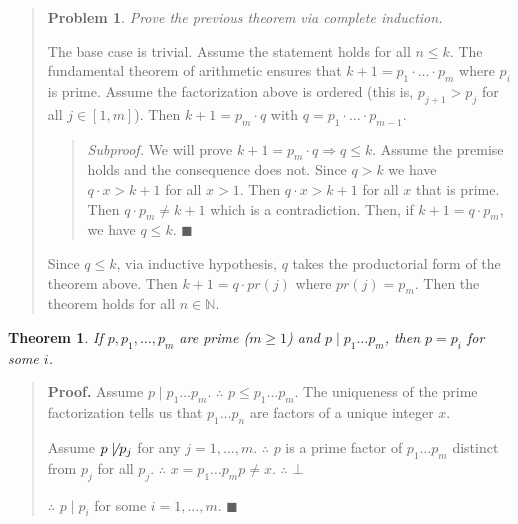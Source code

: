 \documentclass[a4paper, 12pt]{article}
\newtheorem{problem}{Problem}
\newtheorem{theorem}{Theorem}
\newtheorem{problem}{Problem}
\newtheorem{theorem}{Theorem}
\begin{document}
\small
\begin{quote}

\begin{problem}
    Prove the previous theorem via complete induction.
\end{problem}

The base case is trivial. Assume the statement holds for all $n \leq k$. The
fundamental theorem of arithmetic ensures that $k + 1 = p_1 \cdot \ldots \cdot
p_m$ where $p_i$ is prime. Assume the factorization above is ordered (this is,
$p_{j + 1} > p_j$ for all $j \in [1, m]$). Then $k + 1 = p_m \cdot q$ with $q =
p_1 \cdot \ldots \cdot p_{m - 1}$. 

\footnotesize
\begin{quote}
    \textit{Subproof.} We will prove $k + 1 = p_m \cdot q \Rightarrow q \leq k$.
    Assume the premise holds and the consequence does not. Since $q > k$ we have
    $q \cdot x > k + 1$ for all $x > 1$. Then $q \cdot x > k + 1$ for all $x$
    that is prime. Then $q \cdot p_m \neq k + 1$ which is a contradiction. Then,
    if $k + 1 = q \cdot p_m$, we have $q \leq k$. $\blacksquare$
\end{quote}
\small

Since $q \leq k$, via inductive hypothesis, $q$ takes the productorial form of
the theorem above. Then $k + 1 = q \cdot pr(j)$ where $pr(j) = p_m$. Then the
theorem holds for all $n \in \mathbb{N}$.

\end{quote}
\normalsize


\begin{theorem}
    If $p, p_1, \ldots, p_m$ are prime ($m \geq 1$) and $p \mid p_1 \ldots p_m$,
    then $p = p_i$ for some $i$.
\end{theorem}


\small
\begin{quote}

\textbf{Proof.} Assume $p \mid p_1 \ldots p_m$. $\therefore $ $p \leq p_1 \ldots
p_m$. The uniqueness of the prime factorization tells us that $p_1 \ldots p_n
$ are factors of a unique integer $x$.

Assume $p \not\mid p_j$ for any $j = 1, \ldots, m$. $\therefore $ $p$ is a prime
factor of $p_1 \ldots p_m$ distinct from $p_j$ for all $p_j$. $\therefore $ $x = p_1
\ldots p_m p \neq x$. $\therefore $  $\bot$

$\therefore $ $p \mid p_i$ for some $i = 1, \ldots, m$. $\blacksquare$

\end{quote}
\normalsize
\end{document}
